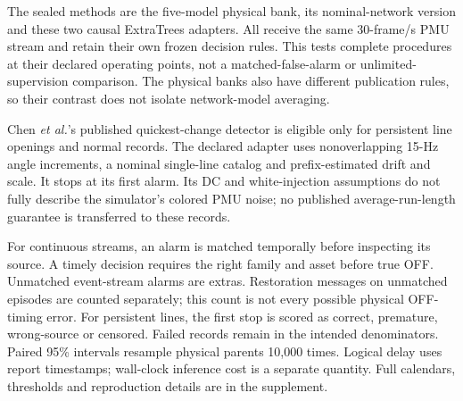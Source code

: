 The sealed methods are the five-model physical bank, its nominal-network
version and these two causal ExtraTrees adapters. All receive the same
30-frame/s PMU stream and retain their own frozen decision rules. This
tests complete procedures at their declared operating points, not a
matched-false-alarm or unlimited-supervision comparison. The physical
banks also have different publication rules, so their contrast does not
isolate network-model averaging.

Chen \emph{et al.}'s published quickest-change detector
\cite{chen2016quickest} is eligible only for persistent line openings and
normal records. The declared adapter uses nonoverlapping 15-Hz angle
increments, a nominal single-line catalog and prefix-estimated drift and
scale. It stops at its first alarm. Its DC and white-injection assumptions
do not fully describe the simulator's colored PMU noise; no published
average-run-length guarantee is transferred to these records.

For continuous streams, an alarm is matched temporally before inspecting
its source. A timely decision requires the right family and asset before
true OFF. Unmatched event-stream alarms are extras. Restoration messages
on unmatched episodes are counted separately; this count is not every
possible physical OFF-timing error. For persistent lines, the first stop
is scored as correct, premature, wrong-source or censored. Failed records
remain in the intended denominators. Paired 95\% intervals resample
physical parents 10,000 times. Logical delay uses report timestamps;
wall-clock inference cost is a separate quantity. Full calendars,
thresholds and reproduction details are in the supplement.
